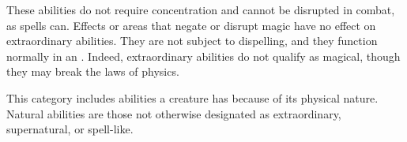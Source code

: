  These abilities do not require concentration and cannot be disrupted in combat, as spells can. Effects or areas that negate or disrupt magic have no effect on extraordinary abilities. They are not subject to dispelling, and they function normally in an . Indeed, extraordinary abilities do not qualify as magical, though they may break the laws of physics.

 This category includes abilities a creature has because of its physical nature. Natural abilities are those not otherwise designated as extraordinary, supernatural, or spell-like.

